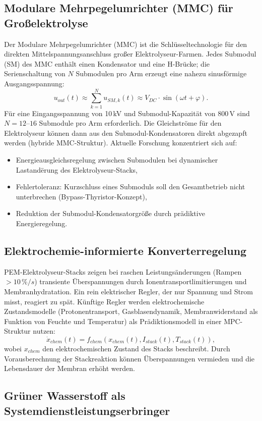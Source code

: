 ﻿\documentclass[a4paper,12pt,openany,oneside]{book}
\newcommand{\unterabschnitt}[1]{\subsection{#1}}
\theoremstyle{definition}
\begin{document}
\unterabschnitt{Modulare Mehrpegelumrichter (MMC) f\"ur Gro\ss{}elektrolyse}

Der Modulare Mehrpegelumrichter (MMC) ist die Schl\"usseltechnologie f\"ur den direkten
Mittelspannungsanschluss gro\ss{}er Elektrolyseur-Farmen. Jedes Submodul (SM) des MMC
enth\"alt einen Kondensator und eine H-Br\"ucke; die Serienschaltung von $N$ Submodulen
pro Arm erzeugt eine nahezu sinusf\"ormige Ausgangsspannung:
\[
  u_{out}(t) \approx \sum_{k=1}^{N} u_{SM,k}(t) \approx V_{DC} \cdot \sin(\omega t + \varphi).
\]
F\"ur eine Eingangsspannung von 10\,kV und Submodul-Kapazit\"at von 800\,V sind
$N = 12$--$16$ Submodule pro Arm erforderlich. Die Gleichstr\"ome f\"ur den Elektrolyseur
k\"onnen dann aus den Submodul-Kondensatoren direkt abgezapft werden (hybride MMC-Struktur).
Aktuelle Forschung konzentriert sich auf:
\begin{itemize}
  \item Energieausgleichsregelung zwischen Submodulen bei dynamischer Lastand\"erung
    des Elektrolyseur-Stacks,
  \item Fehlertoleranz: Kurzschluss eines Submoduls soll den Gesamtbetrieb nicht unterbrechen
    (Bypass-Thyristor-Konzept),
  \item Reduktion der Submodul-Kondensatorgr\"o\ss{}e durch pr\"adiktive Energieregelung.
\end{itemize}

\unterabschnitt{Elektrochemie-informierte Konverterregelung}

PEM-Elektrolyseur-Stacks zeigen bei raschen Leistungs\"anderungen (Rampen $> 10\,\%/s$)
transiente \"Uberspannungen durch Ionentransportlimitierungen und Membranhydratation.
Ein rein elektrischer Regler, der nur Spannung und Strom misst, reagiert zu sp\"at.
K\"unftige Regler werden elektrochemische Zustandsmodelle (Protonentransport, Gasblasendynamik,
Membranwiderstand als Funktion von Feuchte und Temperatur) als Pr\"adiktionsmodell in einer
MPC-Struktur nutzen:
\[
  \dot{x}_{chem}(t) = f_{chem}(x_{chem}(t), I_{stack}(t), T_{stack}(t)),
\]
wobei $x_{chem}$ den elektrochemischen Zustand des Stacks beschreibt. Durch Vorausberechnung
der Stackreaktion k\"onnen \"Uberspannungen vermieden und die Lebensdauer der Membran
erh\"oht werden.

\unterabschnitt{Gr\"uner Wasserstoff als Systemdienstleistungserbringer}
\end{document}
